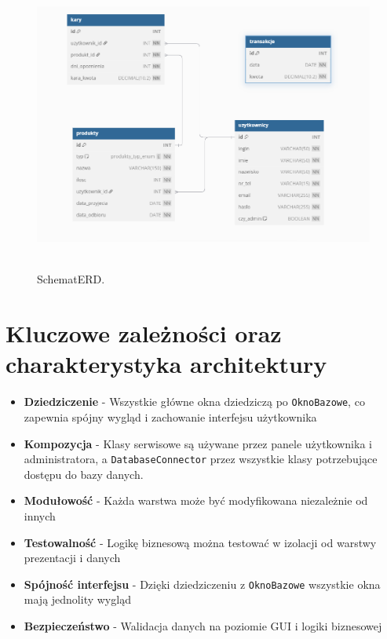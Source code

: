 \begin{figure}[H]
    \centering
    \includegraphics[width=.7\linewidth]{figures/SchematERD.png}\
    \caption{SchematERD.\label{schematERD}}
\end{figure}

\section{Kluczowe zależności oraz charakterystyka architektury}
\begin{itemize}
    \item \textbf{Dziedziczenie} - Wszystkie główne okna dziedziczą po \texttt{OknoBazowe}, co zapewnia spójny wygląd i zachowanie interfejsu użytkownika
    \item \textbf{Kompozycja} - Klasy serwisowe są używane przez panele użytkownika i administratora, a \texttt{DatabaseConnector} przez wszystkie klasy potrzebujące dostępu do bazy danych.
    \item \textbf{Modułowość} - Każda warstwa może być modyfikowana niezależnie od innych
    \item \textbf{Testowalność} - Logikę biznesową można testować w izolacji od warstwy prezentacji i danych
    \item \textbf{Spójność interfejsu} - Dzięki dziedziczeniu z \texttt{OknoBazowe} wszystkie okna mają jednolity wygląd
    \item \textbf{Bezpieczeństwo} - Walidacja danych na poziomie GUI i logiki biznesowej
\end{itemize}
\clearpage
